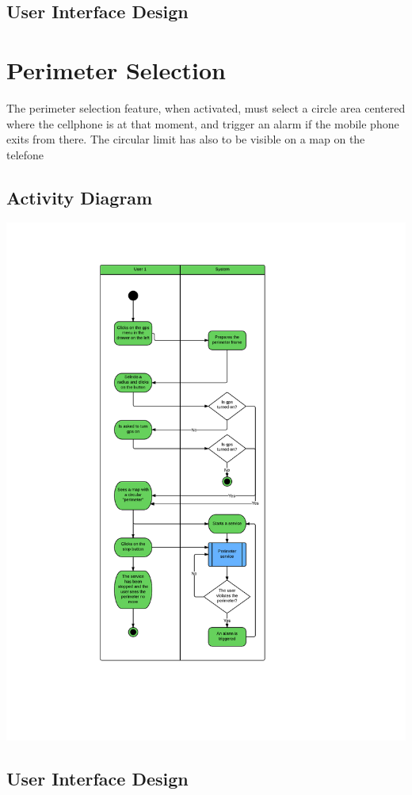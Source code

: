 \newpage
\subsection{User Interface Design}

\section{Perimeter Selection}

The perimeter selection feature, when activated, must select a circle area
centered where the cellphone is at that moment, and trigger an alarm if the
mobile phone exits from there. The circular limit has also to be visible on a
map on the telefone


\newpage
\subsection{Activity Diagram}

\includegraphics[scale=0.7]{images/Perimeter}

\newpage
\subsection{User Interface Design}
